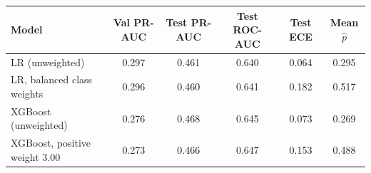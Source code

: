 \begin{tabular}{lccccc}
\toprule
Model & Val PR-AUC & Test PR-AUC & Test ROC-AUC & Test ECE & Mean $\hat p$ \\
\midrule
LR (unweighted) & 0.297 & 0.461 & 0.640 & 0.064 & 0.295 \\
LR, balanced class weights & 0.296 & 0.460 & 0.641 & 0.182 & 0.517 \\
XGBoost (unweighted) & 0.276 & 0.468 & 0.645 & 0.073 & 0.269 \\
XGBoost, positive weight 3.00 & 0.273 & 0.466 & 0.647 & 0.153 & 0.488 \\
\bottomrule
\end{tabular}
